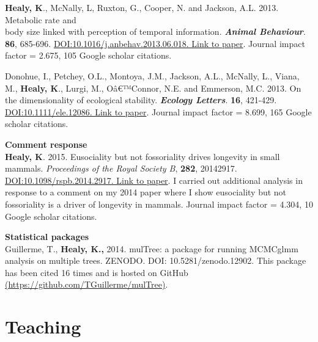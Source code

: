 \documentclass[10pt,a4paper]{article}
\begin{document}
\begin{flushleft}
\bigskip

\textbf{Healy, K}., McNally, L, Ruxton, G., Cooper, N. and Jackson, A.L. 2013. Metabolic rate and\\
body size linked with perception of temporal information.  \textit{\textbf{Animal Behaviour}}. \textbf{86}, 685-696. \href{http://dx.doi.org/10.1016/j.anbehav.2013.06.018}{DOI:10.1016/j.anbehav.2013.06.018. Link to paper}. Journal impact factor = 2.675, 105 Google scholar citations. 

\bigskip

\setlength{\parindent}{0mm}Donohue, I., Petchey, O.L., Montoya, J.M., Jackson, A.L., McNally, L., Viana, M., \textbf{Healy, K}., Lurgi, M., Oâ€™Connor, N.E. and Emmerson, M.C. 2013. On the dimensionality of ecological stability. \textit{\textbf{Ecology Letters}}. \textbf{16}, 421-429. \href{http://onlinelibrary.wiley.com/doi/10.1111/ele.12086/abstract} {DOI:10.1111/ele.12086. Link to paper}. Journal impact factor = 8.699, 165 Google scholar citations.
\bigskip


\textbf{Comment response}\\
\setlength{\parindent}{0mm}\textbf{Healy, K}. 2015.  Eusociality but not fossoriality drives longevity in small mammals. \textit{\textit{Proceedings of the Royal Society B}}, \textbf{282}, 20142917. \href{http://rspb.royalsocietypublishing.org/content/282/1806/20142917} {DOI:10.1098/rspb.2014.2917. Link to paper}.  I carried out additional analysis in response to a comment on my 2014 paper where I show eusociality but not fossoriality is a driver of longevity in mammals. Journal impact factor = 4.304, 10 Google scholar citations.

\bigskip

\textbf{Statistical packages}\\
\setlength{\parindent}{0mm} Guillerme, T., \textbf{Healy, K.,} 2014. mulTree: a package for running MCMCglmm analysis on multiple trees. ZENODO. DOI: 10.5281/zenodo.12902. This package has been cited 16 times and is hosted on GitHub \href{https://github.com/TGuillerme/mulTree}{(https://github.com/TGuillerme/mulTree)}.

\end{flushleft}


\bigskip

\section{\textbf{Teaching}}
\end{document}
